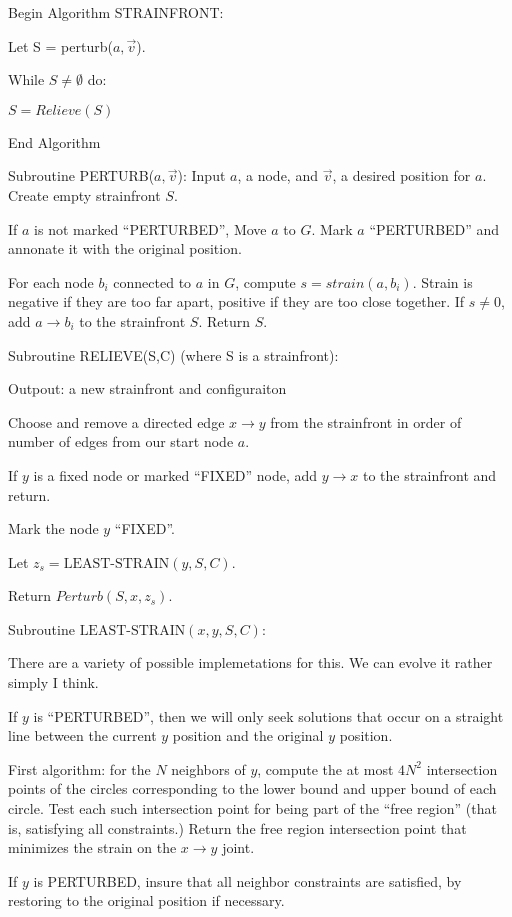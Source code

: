 \documentclass[11pt]{article}
\begin{document}
Begin Algorithm STRAINFRONT:

Let S = perturb($a,\vec{v}$).

While $S \neq \emptyset$ do:

$ S = Relieve(S) $

End Algorithm


Subroutine PERTURB($a,\vec{v}$):
Input $a$, a node, and $\vec{v}$, a desired position for $a$.
Create empty strainfront $S$.

If $a$ is not marked ``PERTURBED'', Move $a$ to $G$.
Mark $a$ ``PERTURBED'' and annonate it with the original position.

For each node $b_i$ connected  to $a$ in $G$,
compute $s = strain(a,b_i)$. Strain is negative if they are too far apart,
positive if they are too close together.
If $s \neq 0$, add  $a \rightarrow b_i$ to the strainfront $S$. Return $S$.

Subroutine RELIEVE(S,C) (where S is a strainfront):

Outpout: a new strainfront and configuraiton

Choose and remove a directed edge $x \rightarrow y$ from the strainfront in order
of number of edges from our start node $a$.

If $y$ is a fixed node or marked ``FIXED'' node, add $y \rightarrow x$ to the strainfront and return.

Mark the node $y$ ``FIXED''.

Let $z_s = \text{LEAST-STRAIN}(y,S,C)$.

Return $Perturb(S,x,z_s)$.

Subroutine $\text{LEAST-STRAIN}(x,y,S,C)$:

There are a variety of possible implemetations for this.  We can evolve it
rather simply I think.

If $y$ is ``PERTURBED'', then we will only seek solutions that occur on a straight line
between the current $y$ position and the original $y$ position.

First algorithm: for the $N$ neighbors of $y$, compute the at most $4N^2$ intersection points
of the circles corresponding to the lower bound and upper bound of each circle. Test
each such intersection point for being part of the ``free region'' (that is, satisfying all
constraints.)  Return the free region intersection point that minimizes the strain on the
$x \rightarrow y$ joint.

If $y$ is PERTURBED, insure that all neighbor constraints are satisfied, by restoring
to the original position if necessary.
\end{document}
